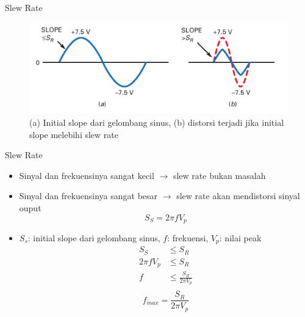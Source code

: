 \begin{frame}{Slew Rate}
	\begin{figure}
		\centering
		\includegraphics[width=\linewidth]{gambar/fig-16.09}
		\caption{(a) Initial slope dari gelombang sinus, (b) distorsi terjadi jika initial slope melebihi slew rate}
		\label{fig-16.09}
	\end{figure}
\end{frame}

\begin{frame}{Slew Rate}
	\begin{itemize}
		\item Sinyal dan frekuensinya sangat kecil $ \rightarrow $ slew rate bukan masalah
		\item Sinyal dan frekuensinya sangat besar $ \rightarrow $ slew rate akan mendistorsi sinyal ouput
		\[ S_S = 2 \pi f V_p \]
		\item $ S_s $: initial slope dari gelombang sinus, $ f $: frekuensi, $ V_p $: nilai peak
		\begin{align*}
			S_S &\leq S_R \\
			2 \pi f V_p &\leq S_R \\
			f &\leq \frac{S_R}{2 \pi V_p} \\
		\end{align*}
		\begin{equation} \label{pers.16.2}
			f_{max} = \frac{S_R}{2 \pi V_p}
		\end{equation}
	\end{itemize}
\end{frame}

